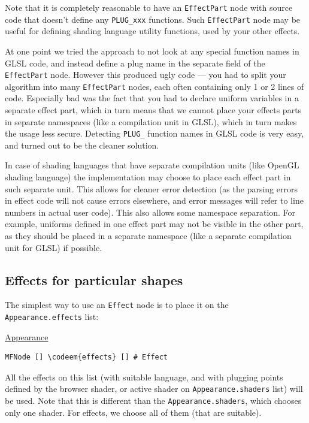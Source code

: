 \documentclass{acmsiggraph}                     %
\newenvironment{mycode}
{\begin{mycodecore}}
{\end{mycodecore}
\vspace{-0.1in}}
\newcommand*{\codeem}[1]{\textbf{#1}}
\begin{document}
Note that it is completely reasonable to have an \texttt{EffectPart} node
with source code that doesn't define any \texttt{PLUG\_xxx} functions.
Such \texttt{EffectPart} node may be useful for defining shading language
utility functions, used by your other effects.


At one point we tried the approach
to not look at any special function names in GLSL code,
and instead define a plug name in the separate field of the \texttt{EffectPart}
node. However this produced ugly code --- you had to split your algorithm
into many \texttt{EffectPart} nodes, each often containing only 1 or 2 lines
of code. Especially bad was the fact that you had to declare uniform variables
in a separate effect part, which in turn means that we cannot place
your effects parts in separate namespaces (like a compilation unit in GLSL),
which in turn makes the usage less secure.
Detecting \texttt{PLUG\_} function names in GLSL code is very easy,
and turned out to be the cleaner solution.

In case of shading languages that have separate compilation units
(like OpenGL shading language) the implementation may choose to place
each effect part in such separate unit. This allows for cleaner error detection
(as the parsing errors in effect code will not cause errors elsewhere,
and error messages will refer to line numbers in actual user code).
This also allows some namespace separation. For example, uniforms defined in one
effect part may not be visible in the other part, as they should be placed
in a separate namespace (like a separate compilation unit for GLSL) if possible.

\subsection{Effects for particular shapes}

The simplest way to use an \texttt{Effect} node is to place it
on the \texttt{Appearance.effects} list:

\begin{mycode}
\underline{Appearance}
\begin{Verbatim}[commandchars=\\\{\}]
MFNode [] \codeem{effects} [] # Effect
\end{Verbatim}
\end{mycode}

All the effects on this list (with suitable language, and with
plugging points defined by the browser shader, or active shader on
\texttt{Appearance.shaders} list) will be used. Note that this is different
than the \texttt{Appearance.shaders}, which chooses only one shader.
For effects, we choose all of them (that are suitable).
\end{document}
